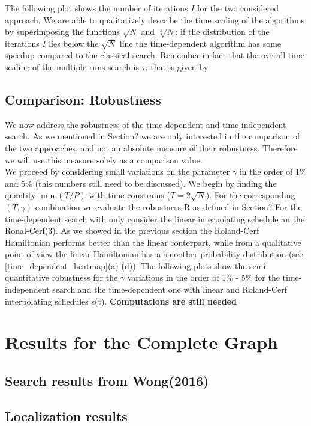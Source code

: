         The following plot shows the number of iterations $I$ for the two considered approach. We are able to qualitatively describe the time scaling of the algorithms by superimposing the functions $\sqrt{N}$ and $\sqrt[3]{N}$: if the distribution of the iterations $I$ lies below the $\sqrt{N}$ line the time-dependent algorithm has some speedup compared to the classical search. Remember in fact that the overall time scaling of the multiple runs search is $\tau$, that is given by \\


    \subsection{Comparison: Robustness}
    We now address the robustness of the time-dependent and time-independent search. As we mentioned in Section? we are only interested in the comparison of the two approaches, and not an absolute measure of their robustness. Therefore we will use this measure solely as a comparison value. \\
    We proceed by considering small variations on the parameter $\gamma$ in the order of 1\% and 5\% (this numbers still need to be discussed). We begin by finding the quantity $\min(T/P)$ with time constrains ($T = 2\sqrt{N}$). For the corresponding $(T,\gamma)$ combination we evaluate the robustness R as defined in Section?
    For the time-dependent search with only consider the linear interpolating schedule an the Ronal-Cerf(3). As we showed in the previous section the Roland-Cerf Hamiltonian performs better than the linear conterpart, while from a qualitative point of view the linear Hamiltonian has a smoother probability distribution (see \cref{time_dependent_heatmap}(a)-(d)). The following plots show the semi-quantitative robustness for the $\gamma$ variations in the order of 1\% - 5\% for the time-independent search and the time-dependent one with linear and Roland-Cerf interpolating schedules s(t). \textbf{Computations are still needed}



\section{Results for the Complete Graph}
    \subsection{Search results from Wong(2016)}
    \subsection{Localization results}
